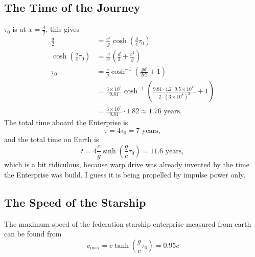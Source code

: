 \documentclass[11pt]{amsart}
\begin{document}
\subsection{The Time of the Journey}
$\tau_0$ is at $x=\frac{d}{2}$, this gives
\begin{align*}
\frac{d}{2} &= \frac{c^2}{g}\cosh\left(\frac{g}{c}\tau_0 \right) \\
\cosh\left(\frac{g}{c}\tau_0 \right) &= \frac{g}{c^2}\left(\frac{d}{2} + \frac{c^2}{g} \right) \\
\tau_0 &= \frac{c}{g}\cosh^{-1}\left(\frac{gd}{2c2} + 1\right) \\
&= \frac{3\times10^8}{9.81}\cosh^{-1}\left(\frac{9.81\cdot4.2\cdot9.5\times10^15}{2\cdot(3\times10^8)^2} +1\right) \\
&= \frac{3\times10^8}{9.81} \cdot 1.82 \approx 1.76 \text{ years}.
\end{align*}
The total time aboard the Enterprise is
\begin{equation}
\tau = 4\tau_0 = 7\text{ years},
\end{equation}
and the total time on Earth is
\begin{equation}
t = 4\frac{c}{g}\sinh\left(\frac{g}{c}\tau_0 \right) = 11.6\text{ years},
\end{equation}
which is a bit ridiculous, because warp drive was already invented by the time the Enterprise was build. I guess it is being propelled by impulse power only.

\subsection{The Speed of the Starship}
The maximum speed of the federation starship enterprise measured from earth can be found from
\begin{equation}
v_{\text{max}} = c\tanh \left(\frac{g}{c} \tau_0 \right) = 0.95c 
\end{equation}
\end{document}
